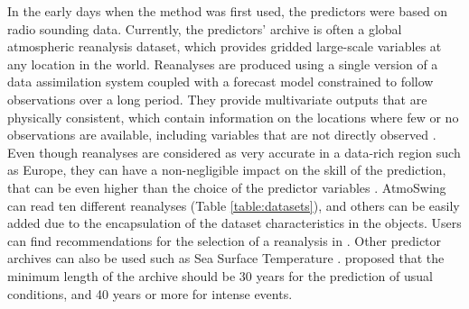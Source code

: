 \documentclass[review]{elsarticle}
\begin{document}
In the early days when the method was first used, the predictors were based on radio sounding data. Currently, the predictors' archive is often a global atmospheric reanalysis dataset, which provides gridded large-scale variables at any location in the world. Reanalyses are produced using a single version of a data assimilation system coupled with a forecast model constrained to follow observations over a long period. They provide multivariate outputs that are physically consistent, which contain information on the locations where few or no observations are available, including variables that are not directly observed \citep{Gelaro2017}. Even though reanalyses are considered as very accurate in a data-rich region such as Europe, they can have a non-negligible impact on the skill of the prediction, that can be even higher than the choice of the predictor variables \cite{Dayon2015, Horton2018b}. AtmoSwing can read ten different reanalyses (Table \ref{table:datasets}), and others can be easily added due to the encapsulation of the dataset characteristics in the objects. Users can find recommendations for the selection of a reanalysis in \cite{Horton2018b}. Other predictor archives can also be used such as Sea Surface Temperature \citep[SST, ][]{Reynolds2007}. \citet{Bontron2004} proposed that the minimum length of the archive should be 30 years for the prediction of usual conditions, and 40 years or more for intense events.
\end{document}
